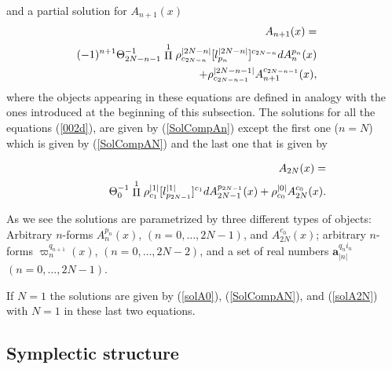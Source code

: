 \documentclass[prd,a4paper,twocolumn,amssymb,amsmath,nofootinbib,showpacs]{revtex4}
\begin{document}
and a partial solution for $A_{n+1}(x)$
\begin{eqnarray}
&&\hspace{-.8cm}A_{n+1}(x)=\nonumber\\
&&\hspace{-.8cm}(-1)^{n+1}\Theta_{2N-n-1}^{-1}\stackrel{1}{\Pi}
\rho_{c_{2N-n}}^{|2N-n|} [l^{|2N-n|}_{p_n}]^{c_{2N-n}} dA_n^{p_n}(x)\nonumber\\
&&\hspace{-.8cm}+
\rho_{c_{2N-n-1}}^{|2N-n-1|}A_{n+1}^{c_{2N-n-1}}(x),\label{SolParAn+1}
\end{eqnarray}
where the objects appearing in these equations are defined in
analogy with the ones introduced at the beginning of this
subsection. The solutions for all the equations (\ref{002d}), are
given by (\ref{SolCompAn}) except the first one ($n=N$) which is
given by (\ref{SolCompAN}) and the last one that is given by

\begin{eqnarray}
&&\hspace{-.8cm}A_{2N}(x)=\label{solA2N}\\
&&\hspace{.5cm}\Theta_0^{-1}\stackrel{1}{\Pi}\rho_{c_1}^{|1|}
[l_{p_{2N-1}}^{|1|}]^{c_1}dA_{2N-1}^{p_{2N-1}}(x)+\rho_{c_0}^{|0|}A_{2N}^{c_0}(x).
\nonumber
\end{eqnarray}

\noindent As we see the solutions are parametrized by three
different types of objects: Arbitrary $n$-forms $A_n^{p_n}(x)$,
$(n=0,\ldots,2N-1)$, and $A_{2N}^{c_0}(x)$; arbitrary $n$-forms
$\varpi_n^{q_{n+1}}(x)$, $(n=0,\ldots,2N-2)$, and a set of real
numbers $\mathbf{a}_{|n|}^{q_ni_n}$ $(n=0,\ldots,2N-1)$.

If $N=1$ the solutions are given by (\ref{solA0}),
(\ref{SolCompAN}), and (\ref{solA2N}) with $N=1$ in these last two
equations.

\subsection{\label{symplectic} Symplectic structure}
\end{document}
